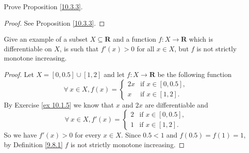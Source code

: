 \begin{exercise}\label{ex 10.3.4}
    Prove Proposition \ref{10.3.3}.
\end{exercise}

\begin{proof}
    See Proposition \ref{10.3.3}.
\end{proof}

\begin{exercise}\label{ex 10.3.5}
    Give an example of a subset \(X \subseteq \mathbf{R}\) and a function \(f : X \to \mathbf{R}\) which is differentiable on \(X\), is such that \(f'(x) > 0\) for all \(x \in X\), but \(f\) is not strictly monotone increasing.
\end{exercise}

\begin{proof}
    Let \(X = [0, 0.5] \cup [1, 2]\) and let \(f : X \to \mathbf{R}\) be the following function
    \[
        \forall\ x \in X, f(x) = \begin{cases}
            2x & \text{if } x \in [0, 0.5], \\
            x  & \text{if } x \in [1, 2].
        \end{cases}
    \]
    By Exercise \ref{ex 10.1.5} we know that \(x\) and \(2x\) are differentiable and
    \[
        \forall\ x \in X, f'(x) = \begin{cases}
            2 & \text{if } x \in [0, 0.5], \\
            1 & \text{if } x \in [1, 2].
        \end{cases}
    \]
    So we have \(f'(x) > 0\) for every \(x \in X\).
    Since \(0.5 < 1\) and \(f(0.5) = f(1) = 1\), by Definition \ref{9.8.1} \(f\) is not strictly monotone increasing.
\end{proof}